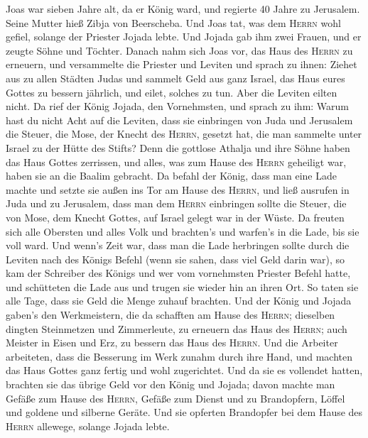  Joas war sieben Jahre alt, da er König ward, und regierte
40 Jahre zu Jerusalem. Seine Mutter hieß Zibja von Beerscheba.
 Und Joas tat, was dem \textsc{Herrn} wohl gefiel, solange
der Priester Jojada lebte.  Und Jojada gab ihm zwei
Frauen, und er zeugte Söhne und Töchter.  Danach nahm sich
Joas vor, das Haus des \textsc{Herrn} zu erneuern,  und
versammelte die Priester und Leviten und sprach zu ihnen: Ziehet aus zu
allen Städten Judas und sammelt Geld aus ganz Israel, das Haus eures
Gottes zu bessern jährlich, und eilet, solches zu tun. Aber die Leviten
eilten nicht.  Da rief der König Jojada, den Vornehmsten,
und sprach zu ihm: Warum hast du nicht Acht auf die Leviten, dass sie
einbringen von Juda und Jerusalem die Steuer, die Mose, der Knecht des
\textsc{Herrn}, gesetzt hat, die man sammelte unter Israel zu der Hütte
des Stifts?  Denn die gottlose Athalja und ihre Söhne
haben das Haus Gottes zerrissen, und alles, was zum Hause des
\textsc{Herrn} geheiligt war, haben sie an die Baalim gebracht.
 Da befahl der König, dass man eine Lade machte und setzte
sie außen ins Tor am Hause des \textsc{Herrn},  und ließ
ausrufen in Juda und zu Jerusalem, dass man dem \textsc{Herrn}
einbringen sollte die Steuer, die von Mose, dem Knecht Gottes, auf
Israel gelegt war in der Wüste.  Da freuten sich alle
Obersten und alles Volk und brachten's und warfen's in die Lade, bis sie
voll ward.  Und wenn's Zeit war, dass man die Lade
herbringen sollte durch die Leviten nach des Königs Befehl (wenn sie
sahen, dass viel Geld darin war), so kam der Schreiber des Königs und
wer vom vornehmsten Priester Befehl hatte, und schütteten die Lade aus
und trugen sie wieder hin an ihren Ort. So taten sie alle Tage, dass sie
Geld die Menge zuhauf brachten.  Und der König und Jojada
gaben's den Werkmeistern, die da schafften am Hause des \textsc{Herrn};
dieselben dingten Steinmetzen und Zimmerleute, zu erneuern das Haus des
\textsc{Herrn}; auch Meister in Eisen und Erz, zu bessern das Haus des
\textsc{Herrn}.  Und die Arbeiter arbeiteten, dass die
Besserung im Werk zunahm durch ihre Hand, und machten das Haus Gottes
ganz fertig und wohl zugerichtet.  Und da sie es
vollendet hatten, brachten sie das übrige Geld vor den König und Jojada;
davon machte man Gefäße zum Hause des \textsc{Herrn}, Gefäße zum Dienst
und zu Brandopfern, Löffel und goldene und silberne Geräte. Und sie
opferten Brandopfer bei dem Hause des \textsc{Herrn} allewege, solange
Jojada lebte.

